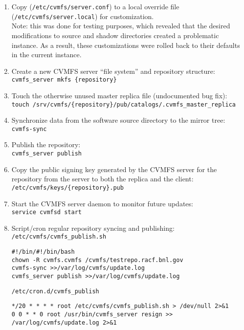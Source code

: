 \documentclass{article}
\begin{document}
\begin{enumerate}
    \item Copy (\verb+/etc/cvmfs/server.conf+) to a local override file
    (\verb+/etc/cvmfs/server.local+) for customization.
    \\
    Note: this was done for testing purposes, 
    which revealed that the desired modifications to source and shadow directories created a problematic instance.  
    As a result, these customizations were rolled back to their defaults in the current instance.  

    \item Create a new CVMFS server “file system” and repository structure:\\ 
    \verb+cvmfs_server mkfs {repository}+

    \item Touch the otherwise unused master replica file (undocumented bug fix):\\
    \verb+touch /srv/cvmfs/{repository}/pub/catalogs/.cvmfs_master_replica+

    \item Synchronize data from the software source directory to the mirror tree: \\
    \verb+cvmfs-sync+

    \item Publish the repository: \\
    \verb+cvmfs_server publish+

    \item Copy the public signing key generated by the CVMFS server for the repository from the server to both the replica and the client: \\
    \verb+/etc/cvmfs/keys/{repository}.pub+

    \item Start the CVMFS server daemon to monitor future updates:\\
    \verb+service cvmfsd start+

    \item Script/cron regular repository syncing and publishing: \\
    \verb+/etc/cvmfs/cvmfs_publish.sh+
    \begin{verbatim}
#!/bin/#!/bin/bash 
chown -R cvmfs.cvmfs /cvmfs/testrepo.racf.bnl.gov
cvmfs-sync >>/var/log/cvmfs/update.log
cvmfs_server publish >>/var/log/cvmfs/update.log
    \end{verbatim}
    \verb+/etc/cron.d/cvmfs_publish+ 
    \begin{verbatim}
*/20 * * * * root /etc/cvmfs/cvmfs_publish.sh > /dev/null 2>&1
0 0 * * 0 root /usr/bin/cvmfs_server resign >>
/var/log/cvmfs/update.log 2>&1
    \end{verbatim}

\end{enumerate}
\end{document}
